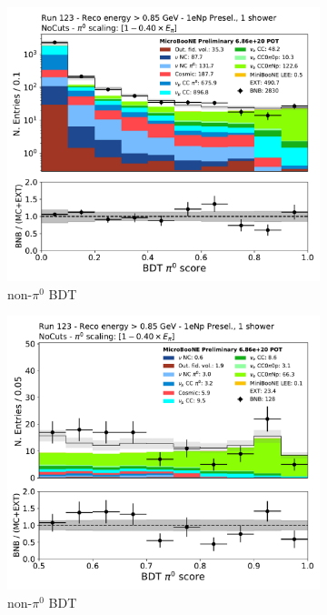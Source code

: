 \begin{figure}[H]
    \centering
    \begin{subfigure}{0.4\textwidth}
    \includegraphics[width=1.0\textwidth]{Sidebands/Figures/1eNp/HighEnergy/HiEext_NPOneShr_None_pi0e040/pi0_score_log.pdf}
    \caption{non-$\pi^0$ BDT}
    \end{subfigure}
    \begin{subfigure}{0.4\textwidth}
    \includegraphics[width=1.0\textwidth]{Sidebands/Figures/1eNp/HighEnergy/HiEext_NPOneShr_None_pi0e040/pi0_score_high_bdt.pdf}
    \caption{non-$\pi^0$ BDT}
    \end{subfigure}
    \caption{} 
    \label{fig:HE_1eNp_8}
\end{figure}


